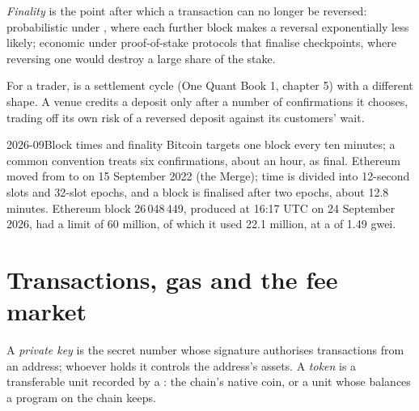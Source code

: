 \begin{definition}[Finality]\label{def:m3:blockchains-for-traders:finality}
\emph{Finality} is the point after which a transaction can no longer be reversed:
probabilistic under , where each further block makes a reversal exponentially less likely;
economic under proof-of-stake protocols that finalise checkpoints, where reversing one would destroy a
large share of the stake.
\end{definition}

For a trader,  is a settlement cycle (One Quant Book 1, chapter 5) with a different shape. A
venue credits a deposit only after a number of confirmations it chooses, trading off its own risk of a
reversed deposit against its customers' wait.

\begin{dated}{2026-09}{Block times and finality}\label{dat:m3:blockchains-for-traders:times}
Bitcoin targets one block every ten minutes; a common convention treats six confirmations, about an hour,
as final. Ethereum moved from  to  on 15 September 2022 (the Merge); time is
divided into 12-second slots and 32-slot epochs, and a block is finalised after two epochs, about 12.8
minutes. Ethereum block 26\,048\,449, produced at 16:17 UTC on 24 September 2026, had a  limit of 60 million,
of which it used 22.1 million, at a  of 1.49 gwei.
\end{dated}

\section{Transactions, gas and the fee market}

\begin{definition}\label{def:m3:blockchains-for-traders:key}
A \emph{private key} is the secret number whose signature authorises transactions from
an address; whoever holds it controls the address's assets. A \emph{token} is a transferable
unit recorded by a : the chain's native coin, or a unit whose balances a program on the chain
keeps.
\end{definition}

